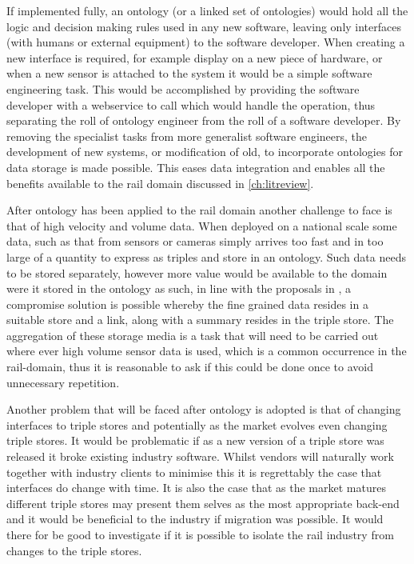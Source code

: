 If implemented fully, an ontology (or a linked set of ontologies) would hold all the logic and decision making rules used in any new software, leaving only interfaces (with humans or external equipment) to the software developer.  When creating a new interface is required, for example display on a new piece of hardware, or when a new sensor is attached to the system it would be a simple software engineering task. This would be accomplished by providing the software developer with a webservice to call which would handle the operation, thus separating the roll of ontology engineer from the roll of a software developer. By removing the specialist tasks from more generalist software engineers, the development of new systems, or modification of old, to incorporate ontologies for data storage is made possible. This eases data integration and enables all the benefits available to the rail domain discussed in \autoref{ch:litreview}.

After ontology has been applied to the rail domain another challenge to face is that of high velocity and volume data. When deployed on a national scale some data, such as that from sensors or cameras simply arrives too fast and in too large of a quantity to express as triples and store in an ontology. Such data needs to be stored separately, however more value would be available to the domain were it stored in the ontology as such, in line with the proposals in \citep{Tutcher2015}, a compromise solution is possible whereby the fine grained data resides in a suitable store and a link, along with a summary resides in the triple store. The aggregation of these storage media is a task that will need to be carried out where ever high volume sensor data is used, which is a common occurrence in the rail-domain, thus it is reasonable to ask if this could be done once to avoid unnecessary repetition.

Another problem that will be faced after ontology is adopted is that of changing interfaces to triple stores and potentially as the market evolves even changing triple stores. It would be problematic if as a new version of a triple store was released it broke existing industry software. Whilst vendors will naturally work together with industry clients to minimise this it is regrettably the case that interfaces do change with time. It is also the case that as the market matures different triple stores may present them selves as the most appropriate back-end and it would be beneficial to the industry if migration was possible. It would there for be good to investigate if it is possible to isolate the rail industry from changes to the triple stores.

